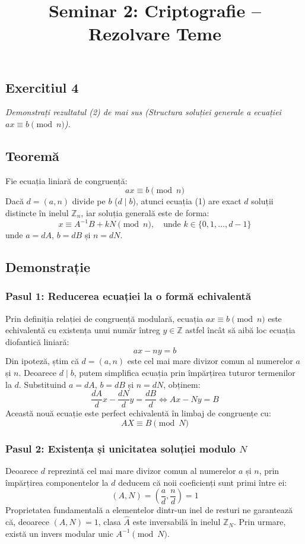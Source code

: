 \documentclass[12pt]{article}
\title{Seminar 2: Criptografie -- Rezolvare Teme}
\author{}
\date{} %
\begin{document}
\maketitle


\subsection*{Exercitiul 4}
\textit{Demonstrați rezultatul (2) de mai sus (Structura soluției generale a ecuației $ax \equiv b \pmod n$).}

\subsection*{Teoremă}
Fie ecuația liniară de congruență:
\begin{equation}
ax \equiv b \pmod n
\end{equation}
Dacă $d = (a, n)$ divide pe $b$ ($d \mid b$), atunci ecuația (1) are exact $d$ soluții distincte în inelul $\mathbb{Z}_n$, iar soluția generală este de forma:
\begin{equation}
x \equiv A^{-1}B + k N \pmod n, \quad \text{unde } k \in \{0, 1, \dots, d-1\}
\end{equation}
unde $a = dA$, $b = dB$ și $n = dN$.

\subsection*{Demonstrație}

\subsubsection*{Pasul 1: Reducerea ecuației la o formă echivalentă}
Prin definiția relației de congruență modulară, ecuația $ax \equiv b \pmod n$ este echivalentă cu existența unui număr întreg $y \in \mathbb{Z}$ astfel încât să aibă loc ecuația diofantică liniară:
\[
ax - ny = b
\]
Din ipoteză, știm că $d = (a, n)$ este cel mai mare divizor comun al numerelor $a$ și $n$. Deoarece $d \mid b$, putem simplifica ecuația prin împărțirea tuturor termenilor la $d$. Substituind $a = dA$, $b = dB$ și $n = dN$, obținem:
\[
\frac{dA}{d}x - \frac{dN}{d}y = \frac{dB}{d} \iff Ax - Ny = B
\]
Această nouă ecuație este perfect echivalentă în limbaj de congruențe cu:
\begin{equation}
AX \equiv B \pmod N
\end{equation}

\subsubsection*{Pasul 2: Existența și unicitatea soluției modulo $N$}
Deoarece $d$ reprezintă cel mai mare divizor comun al numerelor $a$ și $n$, prin împărțirea componentelor la $d$ deducem că noii coeficienți sunt primi între ei:
\[
(A, N) = \left(\frac{a}{d}, \frac{n}{d}\right) = 1
\]
Proprietatea fundamentală a elementelor dintr-un inel de resturi ne garantează că, deoarece $(A, N) = 1$, clasa $\hat{A}$ este inversabilă în inelul $\mathbb{Z}_N$. Prin urmare, există un invers modular unic $A^{-1} \pmod N$.
\end{document}
